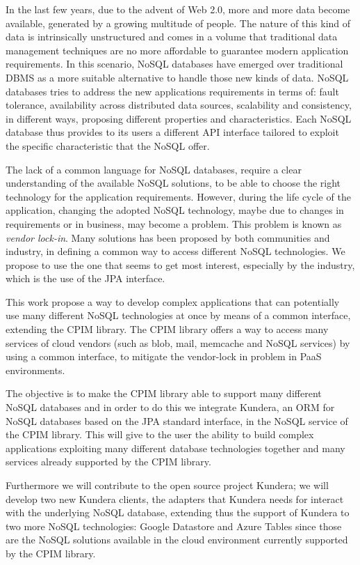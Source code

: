 In the last few years, due to the advent of Web 2.0, more and more data become available, generated by a growing multitude of people. The nature of this kind of data is intrinsically unstructured and comes in a volume that traditional data management techniques are no more affordable to guarantee modern application requirements.
In this scenario, NoSQL databases have emerged over traditional DBMS as a more suitable alternative to handle those new kinds of data. NoSQL databases tries to address the new applications requirements in terms of: fault tolerance, availability across distributed data sources, scalability and consistency, in different ways, proposing different properties and characteristics. 
Each NoSQL database thus provides to its users a different API interface tailored to exploit the specific characteristic that the NoSQL offer.

\noindent The lack of a common language for NoSQL databases, require a clear understanding of the available NoSQL solutions, to be able to choose the right technology for the application requirements. However, during the life cycle of the application, changing the adopted NoSQL technology, maybe due to changes in requirements or in business, may become a problem. This problem is known as \textit{vendor lock-in}. Many solutions has been proposed by both communities and industry, in defining a common way to access different NoSQL technologies. We propose to use the one that seems to get most interest, especially by the industry, which is the use of the JPA interface.

\noindent This work propose a way to develop complex applications that can potentially use many different NoSQL technologies at once by means of a common interface, extending the CPIM library. The CPIM library offers a way to access many services of cloud vendors (such as blob, mail, memcache and NoSQL services) by using a common interface, to mitigate the vendor-lock in problem in PaaS environments.

\noindent The objective is to make the CPIM library able to support many different NoSQL databases and in order to do this we integrate Kundera, an ORM for NoSQL databases based on the JPA standard interface, in the NoSQL service of the CPIM library. This will give to the user the ability to build complex applications exploiting many different database technologies together and many services already supported by the CPIM library.

\noindent Furthermore we will contribute to the open source project Kundera; we will develop two new Kundera clients, the adapters that Kundera needs for interact with the underlying NoSQL database, extending thus the support of Kundera to two more NoSQL technologies: Google Datastore and Azure Tables since those are the NoSQL solutions available in the cloud environment currently supported by the CPIM library.

